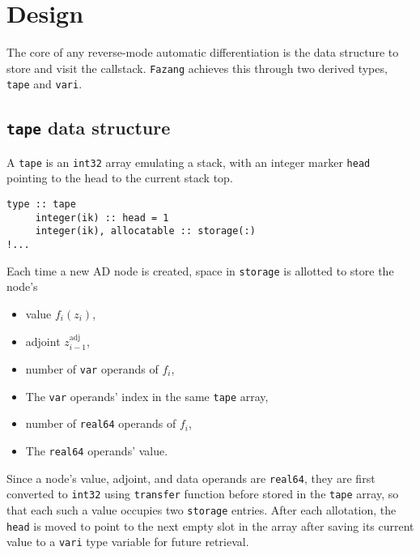 \documentclass[12pt, reqno, oneside]{amsbook}
\numberwithin{equation}{chapter}
\begin{document}
\chapter{Design}
\label{sec:org85ae2ef}
The core of any reverse-mode automatic differentiation is the data
structure to store and visit the callstack. \texttt{Fazang} achieves this
through two derived types, \texttt{tape} and \texttt{vari}.

\section{\texttt{tape} data structure}
\label{sec:org2bb7ef1}
A \texttt{tape} is an \texttt{int32} array emulating a stack, with an integer marker \texttt{head} pointing to the
head to the current stack top.
\begin{verbatim}
type :: tape
     integer(ik) :: head = 1
     integer(ik), allocatable :: storage(:)
!...
\end{verbatim}
Each time a new AD node is created,
space in \texttt{storage} is allotted to store the node's
\begin{itemize}
\item value \(f_i(z_i)\),
\item adjoint \(z_{i-1}^{\text{adj}}\),
\item number of \texttt{var} operands of \(f_i\),
\item The \texttt{var} operands' index in the same \texttt{tape} array,
\item number of \texttt{real64} operands of \(f_i\),
\item The \texttt{real64} operands' value.
\end{itemize}

Since a node's value, adjoint, and data
operands are \texttt{real64}, they are first converted to \texttt{int32} using
\texttt{transfer} function before stored in the \texttt{tape} array, so that each such
a value occupies two \texttt{storage} entries. After each
allotation, the \texttt{head} is moved to point to the next empty slot in
the array after saving its current value to a \texttt{vari} type variable
for future retrieval.
\end{document}
